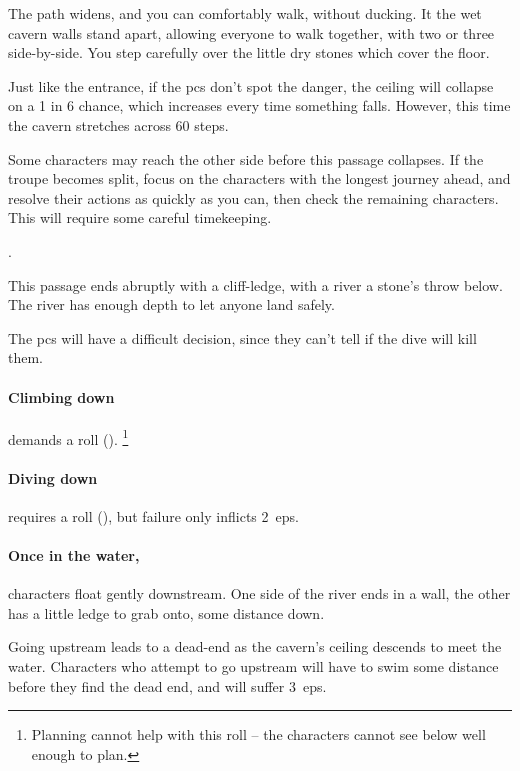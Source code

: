 \begin{multicols}{2}
\begin{boxtext}
  The path widens, and you can comfortably walk, without ducking.
  It the wet cavern walls stand apart, allowing everyone to walk together, with two or three side-by-side.
  You step carefully over the little dry stones which cover the floor.
\end{boxtext}

\caveIn

Just like the entrance, if the \glspl{pc} don't spot the danger, the ceiling will collapse on a 1 in 6 chance, which increases every time something falls.
However, this time the cavern stretches across 60 steps.

Some characters may reach the other side before this passage collapses.
If the troupe becomes split, focus on the characters with the longest journey ahead, and resolve their actions as quickly as you can, then check the remaining characters.
This will require some careful timekeeping.

.


This passage ends abruptly with a cliff-ledge, with a river a stone's throw below.
The river has enough depth to let anyone land safely.

The \glspl{pc} will have a difficult decision, since they can't tell if the dive will kill them.

\paragraph{Climbing down}
demands a  roll (\tn[9]).%
\footnote{Planning cannot help with this roll -- the characters cannot see below well enough to plan.}

\paragraph{Diving down}
requires a  roll (\tn[10]), but failure only inflicts 2~\glspl{ep}.

\paragraph{Once in the water,}
characters float gently downstream.
One side of the river ends in a wall, the other has a little ledge to grab onto, some distance down.

Going upstream leads to a dead-end as the cavern's ceiling descends to meet the water.
Characters who attempt to go upstream will have to swim some distance before they find the dead end, and will suffer 3~\glspl{ep}.


\end{multicols}
